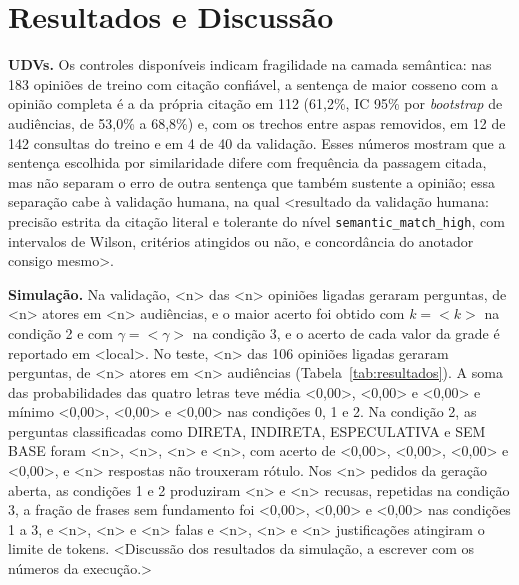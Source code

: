 \section{Resultados e Discuss\~ao}
\label{sec:resultados}

\textbf{UDVs.} Os controles disponíveis indicam fragilidade na camada semântica: nas 183 opiniões de
treino com citação confiável, a sentença de maior cosseno com a opinião completa é a da própria
citação em 112 (61,2\%, IC 95\% por \textit{bootstrap} de audiências, de 53,0\% a 68,8\%) e, com os
trechos entre aspas removidos, em 12 de 142 consultas do treino e em 4 de 40 da validação. Esses
números mostram que a sentença escolhida por similaridade difere com frequência da passagem citada,
mas não separam o erro de outra sentença que também sustente a opinião; essa separação cabe à
validação humana, na qual <resultado da validação humana: precisão estrita da citação literal e
tolerante do nível \texttt{semantic\_match\_high}, com intervalos de Wilson, critérios atingidos ou
não, e concordância do anotador consigo mesmo>.



\textbf{Simulação.} Na validação, <n> das <n> opiniões ligadas geraram perguntas, de <n> atores em
<n> audiências, e o maior acerto foi obtido com $k = {<}k{>}$ na condição 2 e com
$\gamma = {<}\gamma{>}$ na condição 3, e o acerto de cada valor da grade é reportado em <local>. No
teste, <n> das 106 opiniões ligadas geraram perguntas, de <n> atores em <n> audiências
(Tabela~\ref{tab:resultados}). A soma das probabilidades das quatro letras teve média <0,00>, <0,00>
e <0,00> e mínimo <0,00>, <0,00> e <0,00> nas condições 0, 1 e 2. Na condição 2, as perguntas classificadas como
DIRETA, INDIRETA, ESPECULATIVA e SEM BASE foram <n>, <n>, <n> e <n>, com acerto de <0,00>, <0,00>,
<0,00> e <0,00>, e <n> respostas não trouxeram rótulo. Nos <n> pedidos da geração aberta, as condições
1 e 2 produziram <n> e <n> recusas, repetidas na condição 3, a fração de frases sem fundamento foi
<0,00>, <0,00> e <0,00> nas condições 1 a 3, e <n>, <n> e <n> falas e <n>, <n> e <n> justificações
atingiram o limite de tokens. <Discussão dos resultados da simulação, a escrever com os números da execução.>


